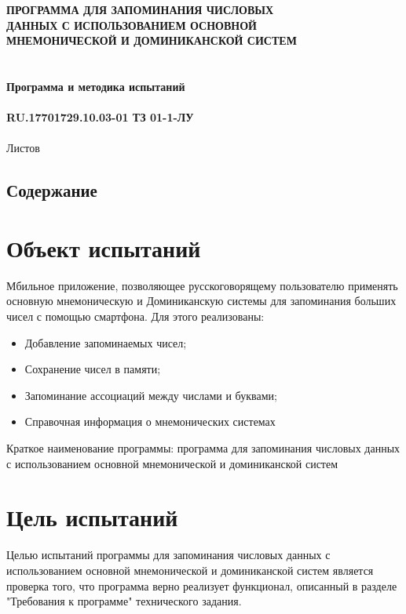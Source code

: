 \documentclass[draft]{article}
\begin{document}
\bigskip
\begin{center}
\topskip=0pt
\vspace*{\fill}
\textbf{ПРОГРАММА ДЛЯ ЗАПОМИНАНИЯ ЧИСЛОВЫХ\\
 ДАННЫХ С ИСПОЛЬЗОВАНИЕМ ОСНОВНОЙ\\
 МНЕМОНИЧЕСКОЙ И ДОМИНИКАНСКОЙ СИСТЕМ\\
~\\
~\\
Программа и методика испытаний\\
~\\
RU.17701729.10.03-01 ТЗ 01-1-ЛУ}\\
~\\
Листов \ztotpages\\
\vspace*{\fill}
\end{center}
\begin{center}
\vspace*{\fill}{
  Москва 2022}
\end{center}
\newpage
\begin{center}
\section {Содержание}
\tableofcontents
\end{center}
\newpage
\section {Объект испытаний}
Мбильное приложение, позволяющее русскоговорящему пользователю применять основную мнемоническую и Доминиканскую системы для запоминания больших чисел с помощью смартфона. Для этого реализованы:
\begin{itemize}
    \item Добавление запоминаемых чисел;
    \item Сохранение чисел в памяти;
    \item Запоминание ассоциаций между числами и буквами;
    \item Справочная информация о мнемонических системах
\end{itemize}
Краткое наименование программы: программа для запоминания числовых данных с использованием основной мнемонической и доминиканской систем\\
\newpage
\section {Цель испытаний}
Целью испытаний программы для запоминания числовых данных с использованием основной мнемонической и доминиканской систем является проверка того, что программа верно реализует функционал, описанный в разделе "{}Требования к программе"{} технического задания.
\newpage
\end{document}
